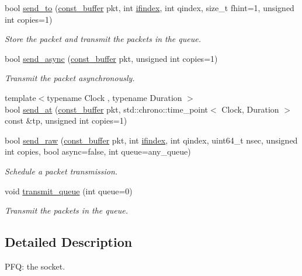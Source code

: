 \begin{DoxyCompactItemize}
bool \hyperlink{classpfq_1_1socket_a3fddba43aa4da1f30fc04cdc3556054a}{send\+\_\+to} (\hyperlink{namespacepfq_ac835a1bd09b4cbaba61c100b50d0a99f}{const\+\_\+buffer} pkt, int \hyperlink{namespacepfq_a251ac5cc269aa123009754edf62ab8b4}{ifindex}, int qindex, size\+\_\+t fhint=1, unsigned int copies=1)
\begin{DoxyCompactList}\small\item\em Store the packet and transmit the packets in the queue. \end{DoxyCompactList}\item 
bool \hyperlink{classpfq_1_1socket_a16f84967f992ee861e5f18d5e29a3275}{send\+\_\+async} (\hyperlink{namespacepfq_ac835a1bd09b4cbaba61c100b50d0a99f}{const\+\_\+buffer} pkt, unsigned int copies=1)
\begin{DoxyCompactList}\small\item\em Transmit the packet asynchronously. \end{DoxyCompactList}\item 
{\footnotesize template$<$typename Clock , typename Duration $>$ }\\bool \hyperlink{classpfq_1_1socket_a730cae7c25a32b22cc79615cbf3f86aa}{send\+\_\+at} (\hyperlink{namespacepfq_ac835a1bd09b4cbaba61c100b50d0a99f}{const\+\_\+buffer} pkt, std\+::chrono\+::time\+\_\+point$<$ Clock, Duration $>$ const \&tp, unsigned int copies=1)
\item 
bool \hyperlink{classpfq_1_1socket_acac34057071b86506de185c1a68f9296}{send\+\_\+raw} (\hyperlink{namespacepfq_ac835a1bd09b4cbaba61c100b50d0a99f}{const\+\_\+buffer} pkt, int \hyperlink{namespacepfq_a251ac5cc269aa123009754edf62ab8b4}{ifindex}, int qindex, uint64\+\_\+t nsec, unsigned int copies, bool async=false, int queue=any\+\_\+queue)
\begin{DoxyCompactList}\small\item\em Schedule a packet transmission. \end{DoxyCompactList}\item 
void \hyperlink{classpfq_1_1socket_a1378f9f0351c8fbb3123fc793bed22d2}{transmit\+\_\+queue} (int queue=0)
\begin{DoxyCompactList}\small\item\em Transmit the packets in the queue. \end{DoxyCompactList}\end{DoxyCompactItemize}


\subsection{Detailed Description}
P\+FQ\+: the socket. 

